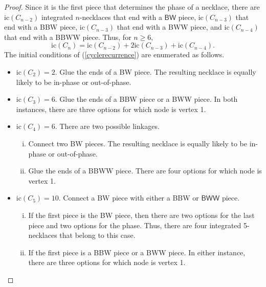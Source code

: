 \documentclass[11pt, reqno]{amsart}
\theoremstyle{definition}
\renewcommand{\geq}{\geqslant}
\begin{document}
\begin{proof}
Since it is the first piece that determines the phase of a necklace, there are $\text{ic}(C_{n-2})$ integrated $n$-necklaces that end with a $\textsf{BW}$ piece, $\text{ic}(C_{n-3})$ that end with a \textsf{BBW} piece, $\text{ic}(C_{n-3})$ that end with a \textsf{BWW} piece, and $\text{ic}(C_{n-4})$ that end with a \textsf{BBWW} piece. Thus, for $n \geq 6,$
\begin{equation}
\label{cyclerecurrence}
\text{ic}(C_n) = \text{ic}(C_{n-2})+2\text{ic}(C_{n-3})+ \text{ic}(C_{n-4}).
\end{equation}
The initial conditions of (\ref{cyclerecurrence}) are enumerated as follows.
\begin{itemize}
\item $\text{ic}(C_2) = 2.$ Glue the ends of a \textsf{BW} piece. The resulting necklace is equally likely to be in-phase or out-of-phase.

\item $\text{ic}(C_3) = 6.$ Glue the ends of a \textsf{BBW} piece or a \textsf{BWW piece}. In both instances, there are three options for which node is vertex 1.

\item $\text{ic}(C_4) = 6.$ There are two possible linkages.
\begin{enumerate}[i.]
    \item Connect two \textsf{BW} pieces. The resulting necklace is equally likely to be in-phase or out-of-phase.
    \item Glue the ends of a \textsf{BBWW} piece. There are four options for which node is vertex 1.
\end{enumerate}

\item $\text{ic}(C_5) = 10.$ Connect a \textsf{BW} piece with either a \textsf{BBW} or $\textsf{BWW}$ piece.
\begin{enumerate}[i.]
    \item If the first piece is the \textsf{BW} piece, then there are two options for the last piece and two options for the phase. Thus, there are four integrated 5-necklaces that belong to this case.
    \item If the first piece is a \textsf{BBW} piece or a \textsf{BWW} piece. In either instance, there are three options for which node is vertex 1.
\end{enumerate}
\end{itemize}
\end{proof}
\end{document}

